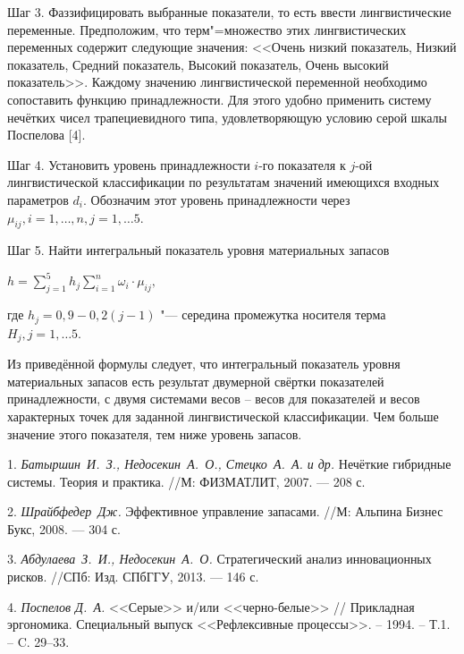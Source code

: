 Шаг 3.
Фаззифицировать выбранные показатели, то есть ввести лингвистические переменные.
Предположим, что терм"=множество этих лингвистических переменных содержит следующие значения: <<Очень низкий показатель, Низкий показатель, Средний показатель, Высокий показатель, Очень высокий показатель>>. Каждому значению лингвистической переменной необходимо сопоставить функцию принадлежности. Для этого удобно применить систему нечётких чисел трапециевидного типа, удовлетворяющую условию серой шкалы Поспелова [4].

Шаг 4.
Установить уровень принадлежности $i$-го показателя к $j$-ой лингвистической классификации по результатам значений имеющихся входных параметров $d_{i}$. Обозначим этот уровень принадлежности через $\mu_{ij}, i = 1, \ldots, n,  j = 1, \ldots 5$.

Шаг 5.
Найти интегральный показатель уровня материальных запасов
\begin{center}
$ h = \sum_{j = 1}^{5} h_{j} \sum_{i = 1}^{n} \omega_{i} \cdot \mu_{ij},$
\end{center}
где $h_{j} = 0,9 - 0,2(j - 1)$ "--- середина промежутка носителя терма $H_{j}, j = 1, \ldots 5$.

Из приведённой формулы следует, что  интегральный показатель уровня материальных запасов есть результат двумерной свёртки показателей принадлежности, с двумя системами весов – весов для показателей и весов характерных точек для заданной  лингвистической классификации. Чем больше значение этого показателя, тем ниже уровень запасов.



\litlist

1. {\it Батыршин~И.~З., Недосекин~А.~О., Стецко~А.~А. и др.} Нечёткие гибридные системы. Теория и
практика. //М: ФИЗМАТЛИТ, 2007. — 208 с.

2. {\it Шрайбфедер~Дж.} Эффективное управление запасами. //М: Альпина Бизнес Букс, 2008. — 304 с.

3. {\it Абдулаева~З.~И., Недосекин~А.~О.} Стратегический анализ инновационных рисков. //СПб: Изд. СПбГГУ, 2013. — 146 с.

4. {\it Поспелов Д.~А.} <<Серые>> и/или <<черно-белые>> // Прикладная эргономика. Специальный выпуск <<Рефлексивные процессы>>. – 1994. – Т.1. – C. 29–33.
